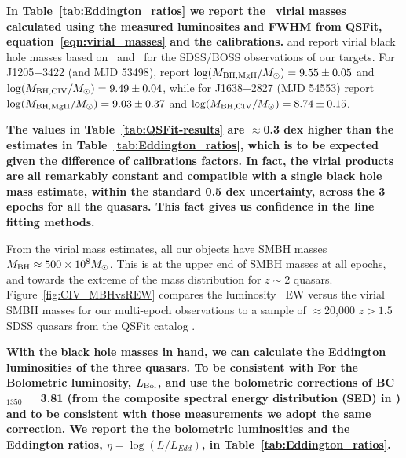 \documentclass[fleqn,usenatbib]{mnras}
\begin{document}
{\bf In Table~\ref{tab:Eddington_ratios} we report the \civ\ virial
  masses calculated using the measured
luminosites and FWHM from QSFit, equation~\ref{eqn:virial_masses} and the
\citet{VestergaardPeterson2006} calibrations.} \citet{Shen2011} and
\citet{Kozlowski2017} report virial black hole masses based on \mgii\
and \civ\ for the SDSS/BOSS observations of our targets. For
J1205+3422 (and MJD 53498), \citet{Shen2011} report $\log (M_{\rm BH, MgII}/M_{\odot})
= 9.55 \pm 0.05$ and $\log(M_{\rm BH, CIV}/M_{\odot}) = 9.49 \pm
0.04$, while for J1638+2827 (MJD 54553) \citet{Shen2011} report 
$\log (M_{\rm BH, MgII}/M_{\odot}) = 9.03 \pm 0.37$ and
$\log(M_{\rm BH, CIV}/M_{\odot}) = 8.74 \pm 0.15$.

{\bf The values in Table~\ref{tab:QSFit-results} are
$\approx$0.3 dex higher than the estimates in
Table~\ref{tab:Eddington_ratios}, which is to be expected given the
difference of calibrations factors. In fact, the virial products are
all remarkably constant and compatible with a single black hole mass
estimate, within the standard 0.5 dex uncertainty, across the 3 epochs
for all the quasars.  This fact gives us confidence in the line
fitting methods.}

From the virial mass estimates, all our objects have SMBH masses $M_{\rm BH} \approx 500\times10^{8} M_{\odot}$.  This is at the upper end of SMBH masses at all epochs, and towards the extreme of the mass distribution for $z\sim2$ quasars.  Figure~\ref{fig:CIV_MBHvsREW} compares the luminosity \civ\ EW versus the virial SMBH masses for our multi-epoch 
observations to a sample of $\approx$20,000 $z>1.5$ SDSS quasars from
the QSFit catalog \citep{Calderone2017}.

{\bf With the black hole masses in hand, we can calculate the
Eddington luminosities of the three quasars. To be consistent with For
the Bolometric luminosity, $L_{\rm Bol}$, \citet{Shen2011} and
\citet{Kozlowski2017} use the bolometric corrections of BC$_{1350}$ =
3.81 (from the composite spectral energy distribution (SED) in
\citet{Richards2006b}) and to be consistent with those measurements we
adopt the same correction.  We report the the bolometric luminosities
and the Eddington ratios, $\eta=\log(L_{}/L_{Edd})$, in
Table~\ref{tab:Eddington_ratios}.  }
\end{document}
